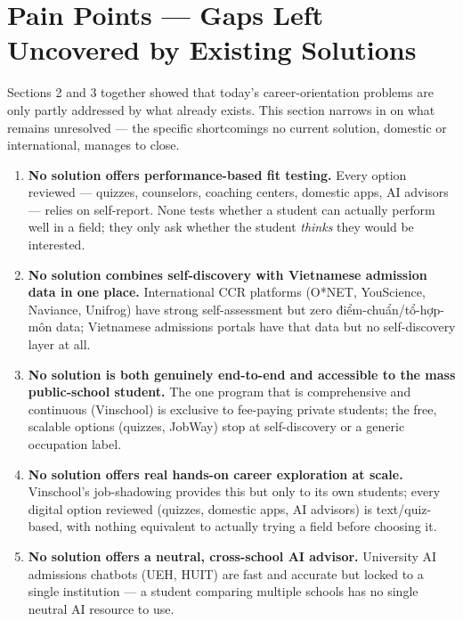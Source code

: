 \documentclass[a4paper]{article}
\begin{document}
\section{Pain Points --- Gaps Left Uncovered by Existing Solutions}

Sections 2 and 3 together showed that today's career-orientation problems are only partly
addressed by what already exists. This section narrows in on what remains unresolved --- the
specific shortcomings no current solution, domestic or international, manages to close.

\begin{enumerate}
    \item \textbf{No solution offers performance-based fit testing.} Every option reviewed ---
    quizzes, counselors, coaching centers, domestic apps, AI advisors --- relies on self-report.
    None tests whether a student can actually perform well in a field; they only ask whether
    the student \textit{thinks} they would be interested.

    \item \textbf{No solution combines self-discovery with Vietnamese admission data in one
    place.} International CCR platforms (O*NET, YouScience, Naviance, Unifrog) have strong
    self-assessment but zero điểm-chuẩn/tổ-hợp-môn data; Vietnamese admissions portals have that
    data but no self-discovery layer at all.

    \item \textbf{No solution is both genuinely end-to-end and accessible to the mass
    public-school student.} The one program that is comprehensive and continuous (Vinschool) is
    exclusive to fee-paying private students; the free, scalable options (quizzes, JobWay) stop
    at self-discovery or a generic occupation label.

    \item \textbf{No solution offers real hands-on career exploration at scale.} Vinschool's
    job-shadowing provides this but only to its own students; every digital option reviewed
    (quizzes, domestic apps, AI advisors) is text/quiz-based, with nothing equivalent to
    actually trying a field before choosing it.

    \item \textbf{No solution offers a neutral, cross-school AI advisor.} University AI
    admissions chatbots (UEH, HUIT) are fast and accurate but locked to a single institution ---
    a student comparing multiple schools has no single neutral AI resource to use.


\end{enumerate}
\end{document}
